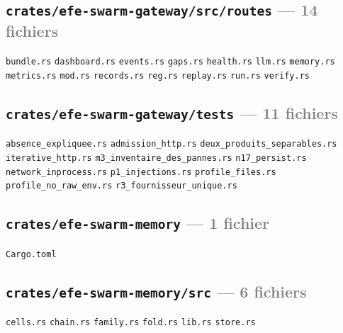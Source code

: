 \documentclass[10pt]{report}
\newcommand{\code}[1]{\texttt{\small #1}}
\begin{document}
\subsection*{\code{crates/efe-swarm-gateway/src/routes} \normalfont\textcolor{grey}{--- 14 fichiers}}
\begin{sloppypar}\footnotesize\raggedright
\code{bundle.rs} \;\textbullet\; \code{dashboard.rs} \;\textbullet\; \code{events.rs} \;\textbullet\; \code{gaps.rs} \;\textbullet\; \code{health.rs} \;\textbullet\; \code{llm.rs} \;\textbullet\; \code{memory.rs} \;\textbullet\; \code{metrics.rs} \;\textbullet\; \code{mod.rs} \;\textbullet\; \code{records.rs} \;\textbullet\; \code{reg.rs} \;\textbullet\; \code{replay.rs} \;\textbullet\; \code{run.rs} \;\textbullet\; \code{verify.rs}
\end{sloppypar}

\subsection*{\code{crates/efe-swarm-gateway/tests} \normalfont\textcolor{grey}{--- 11 fichiers}}
\begin{sloppypar}\footnotesize\raggedright
\code{absence\_expliquee.rs} \;\textbullet\; \code{admission\_http.rs} \;\textbullet\; \code{deux\_produits\_separables.rs} \;\textbullet\; \code{iterative\_http.rs} \;\textbullet\; \code{m3\_inventaire\_des\_pannes.rs} \;\textbullet\; \code{n17\_persist.rs} \;\textbullet\; \code{network\_inprocess.rs} \;\textbullet\; \code{p1\_injections.rs} \;\textbullet\; \code{profile\_files.rs} \;\textbullet\; \code{profile\_no\_raw\_env.rs} \;\textbullet\; \code{r3\_fournisseur\_unique.rs}
\end{sloppypar}

\subsection*{\code{crates/efe-swarm-memory} \normalfont\textcolor{grey}{--- 1 fichier}}
\begin{sloppypar}\footnotesize\raggedright
\code{Cargo.toml}
\end{sloppypar}

\subsection*{\code{crates/efe-swarm-memory/src} \normalfont\textcolor{grey}{--- 6 fichiers}}
\begin{sloppypar}\footnotesize\raggedright
\code{cells.rs} \;\textbullet\; \code{chain.rs} \;\textbullet\; \code{family.rs} \;\textbullet\; \code{fold.rs} \;\textbullet\; \code{lib.rs} \;\textbullet\; \code{store.rs}
\end{sloppypar}
\end{document}
